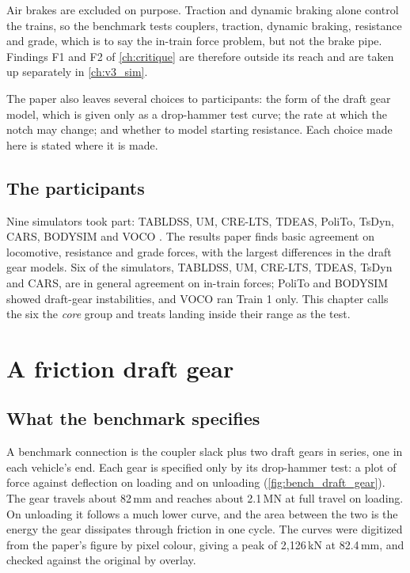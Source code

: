 Air brakes are excluded on purpose. Traction and dynamic braking alone control the trains, so the benchmark tests couplers, traction, dynamic braking, resistance and grade, which is to say the in-train force problem, but not the brake pipe. Findings F1 and F2 of \cref{ch:critique} are therefore outside its reach and are taken up separately in \cref{ch:v3_sim}.

The paper also leaves several choices to participants: the form of the draft gear model, which is given only as a drop-hammer test curve; the rate at which the notch may change; and whether to model starting resistance. Each choice made here is stated where it is made.

\subsection{The participants}

Nine simulators took part: TABLDSS, UM, CRE-LTS, TDEAS, PoliTo, TsDyn, CARS, BODYSIM and VOCO \cite{Wu2018BenchmarkResults}. The results paper finds basic agreement on locomotive, resistance and grade forces, with the largest differences in the draft gear models. Six of the simulators, TABLDSS, UM, CRE-LTS, TDEAS, TsDyn and CARS, are in general agreement on in-train forces; PoliTo and BODYSIM showed draft-gear instabilities, and VOCO ran Train 1 only. This chapter calls the six the \emph{core} group and treats landing inside their range as the test.

\section{A friction draft gear}
\label{sec:bench_draft_gear}

\subsection{What the benchmark specifies}

A benchmark connection is the coupler slack plus two draft gears in series, one in each vehicle's end. Each gear is specified only by its drop-hammer test: a plot of force against deflection on loading and on unloading (\cref{fig:bench_draft_gear}). The gear travels about 82\,mm and reaches about 2.1\,MN at full travel on loading. On unloading it follows a much lower curve, and the area between the two is the energy the gear dissipates through friction in one cycle. The curves were digitized from the paper's figure by pixel colour, giving a peak of 2,126\,kN at 82.4\,mm, and checked against the original by overlay.


